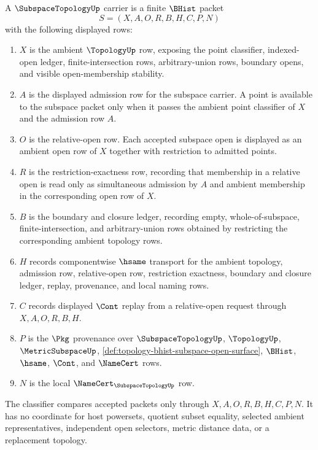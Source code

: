 \begin{definition}
\label{def:subspace-topology-carrier}
A $\SubspaceTopologyUp$ carrier is a finite $\BHist$ packet
$$
S=(X,A,O,R,B,H,C,P,N)
$$
with the following displayed rows:
\begin{enumerate}
\item $X$ is the ambient $\TopologyUp$ row, exposing the point classifier, indexed-open ledger, finite-intersection rows, arbitrary-union rows, boundary opens, and visible open-membership stability.
\item $A$ is the displayed admission row for the subspace carrier. A point is available to the subspace packet only when it passes the ambient point classifier of $X$ and the admission row $A$.
\item $O$ is the relative-open row. Each accepted subspace open is displayed as an ambient open row of $X$ together with restriction to admitted points.
\item $R$ is the restriction-exactness row, recording that membership in a relative open is read only as simultaneous admission by $A$ and ambient membership in the corresponding open row of $X$.
\item $B$ is the boundary and closure ledger, recording empty, whole-of-subspace, finite-intersection, and arbitrary-union rows obtained by restricting the corresponding ambient topology rows.
\item $H$ records componentwise $\hsame$ transport for the ambient topology, admission row, relative-open row, restriction exactness, boundary and closure ledger, replay, provenance, and local naming rows.
\item $C$ records displayed $\Cont$ replay from a relative-open request through $X,A,O,R,B,H$.
\item $P$ is the $\Pkg$ provenance over $\SubspaceTopologyUp$, $\TopologyUp$, $\MetricSubspaceUp$, \autoref{def:topology-bhist-subspace-open-surface}, $\BHist$, $\hsame$, $\Cont$, and $\NameCert$ rows.
\item $N$ is the local $\NameCert_{\SubspaceTopologyUp}$ row.
\end{enumerate}
The classifier compares accepted packets only through $X,A,O,R,B,H,C,P,N$. It has no coordinate for host powersets, quotient subset equality, selected ambient representatives, independent open selectors, metric distance data, or a replacement topology.
\end{definition}

